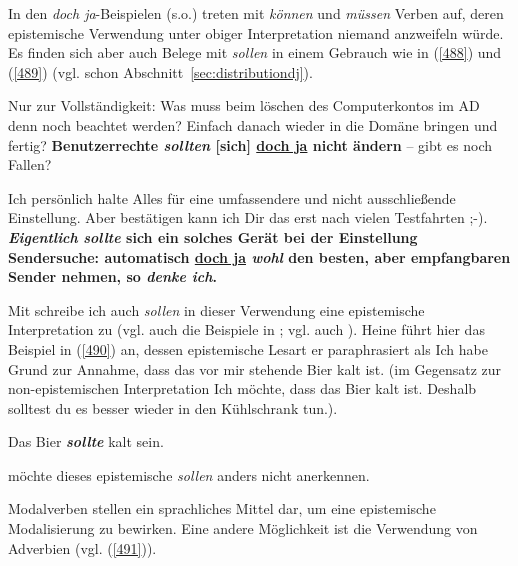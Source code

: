In den \textit{doch ja}-Beispielen (s.o.) treten mit \textit{können} und \textit{müssen} Verben auf, deren epistemische Verwendung unter obiger Interpretation niemand anzweifeln würde. Es finden sich aber auch Belege mit \textit{sollen} in einem Gebrauch wie in (\ref{488}) und (\ref{489}) (vgl. schon Abschnitt~\ref{sec:distributiondj}).

\begin{exe}
	\ex\label{488} 
	\scriptsize
	Nur zur Vollständigkeit: Was muss beim löschen des Computerkontos im AD denn noch beachtet werden? Einfach danach wieder in die Domäne bringen und fertig? \textbf{Benutzerrechte \textit{sollten} [sich] \underline{doch ja} nicht ändern} – gibt es noch Fallen?
\end{exe}

\begin{exe}
	\ex\label{489} 
	\scriptsize
	Ich persönlich halte \glqq Alles für eine umfassendere und nicht ausschließende Einstellung. Aber bestätigen kann ich Dir das erst nach vielen Testfahrten ;-). \textbf{\textit{Eigentlich} \textit{sollte} sich ein solches Gerät bei der Einstellung \glqq Sendersuche: automatisch\grqq{} \underline{doch ja} \textit{wohl} den besten, aber empfangbaren Sender nehmen, so \textit{denke ich}.}
\end{exe}
Mit \citet[33]{Heine1995} schreibe ich auch \textit{sollen} in dieser Verwendung eine epistemische Interpretation zu (vgl. auch die Beispiele in \citealt[350]{Loetscher1991}; vgl. auch \citealt[27, Fn 4]{Mache2009}). Heine führt hier das Beispiel in (\ref{490}) an, dessen epistemische Lesart er paraphrasiert als \glq Ich habe Grund zur Annahme, dass das vor mir stehende Bier kalt ist.\grq {} (im Gegensatz zur non-epistemischen Interpretation \glq Ich möchte, dass das Bier kalt ist. Deshalb solltest du es besser wieder in den Kühlschrank tun.\grq {}).

\begin{exe}
	\ex\label{490} 
	Das Bier \textbf{\textit{sollte}} kalt sein.
\end{exe}
\citet[202, Fn 32-34]{Diewald1999b} möchte dieses epistemische \textit{sollen} anders nicht anerkennen.

Modalverben stellen ein  sprachliches Mittel dar, um eine epistemische Modalisierung zu bewirken. Eine andere Möglichkeit ist die Verwendung von  Adverbien (vgl. (\ref{491})).

